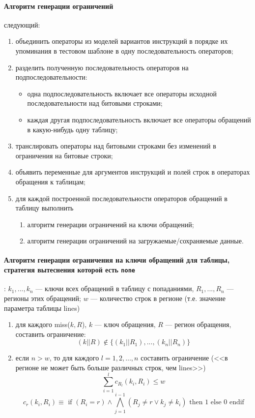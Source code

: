 \paragraph{Алгоритм генерации ограничений} следующий:
\begin{enumerate}
    \item объединить операторы из моделей вариантов инструкций в порядке их упоминания в тестовом шаблоне в одну последовательность операторов;
    \item разделить полученную последовательность операторов на
подпоследовательности:
            \begin{itemize}
                \item одна подпоследовательность включает все операторы исходной
последовательности над битовыми строками;
                \item каждая другая подпоследовательность включает все операторы
обращений в какую-нибудь одну таблицу;
            \end{itemize}
    \item транслировать операторы над битовыми строками без изменений в
ограничения на битовые строки;
    \item объявить переменные для аргументов инструкций и полей строк в
операторах обращения к таблицам;
    \item для каждой построенной последовательности операторов обращений в таблицу выполнить
            \begin{enumerate}
                \item алгоритм генерации ограничений на ключи обращений;
                \item алгоритм генерации ограничений на загружаемые/сохраняемые
данные.
            \end{enumerate}
\end{enumerate}

\paragraph{Алгоритм генерации ограничения на ключи обращений для таблицы,
стратегия вытеснения которой есть \texttt{none}}: $k_1, ..., k_n$ --- ключи всех
обращений в таблицу с попаданиями, $R_1, ..., R_n$ --- регионы этих обращений;
$w$ --- количество строк в регионе (т.е. значение параметра таблицы lines)

\begin{enumerate}
    \item для каждого miss($k, R$), $k$ --- ключ обращения, $R$ --- регион
обращения, составить ограничение: $$(k||R) \notin \{(k_1||R_1), ..., (k_n||R_n)
\}$$

    \item если $n > w$, то для каждого $l = 1, 2, \dots, n$ составить
ограничение (<<в регионе не может быть больше различных строк, чем lines>>)
$$\sum_{i=1}^l c_{R_l} (k_i, R_i) \leqslant w$$
$$c_r (k_i, R_i) \equiv \mbox{~if~} (R_i = r ) \wedge \bigwedge_{j=1}^{i-1} (R_j
\neq r \vee k_j \neq k_i) \mbox{~then~} 1 \mbox{~else~} 0 \mbox{~endif}$$
\end{enumerate}

